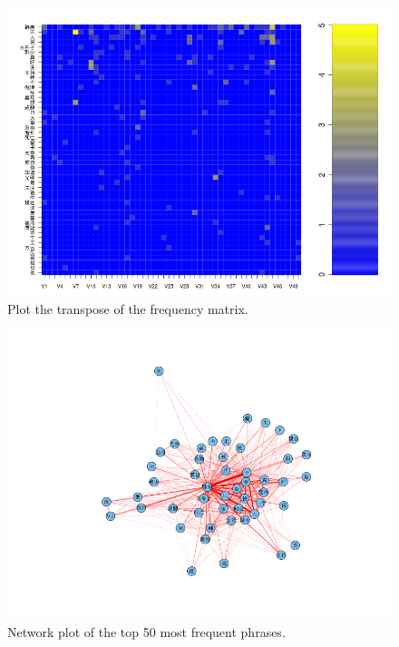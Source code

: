 \documentclass[11pt]{article}
\newcommand{\1}[1]{{\mathbf 1}\left\{#1\right\}}        %
\begin{document}


\begin{center}
\begin{figure}[tb]
   \centering
   \includegraphics[width=\textwidth]{../wordFreqMat.png} 
      \caption{Plot the transpose of the frequency matrix.}
   \label{fig:freqmat}
\end{figure}
\end{center}

\begin{center}
\begin{figure}[tb]
   \centering
   \includegraphics[width=\textwidth]{../coocurResults/cooccurNetwork.png} 
      \caption{Network plot of the top 50 most frequent phrases.}
   \label{fig:coocur}
\end{figure}
\end{center}
\end{document}
